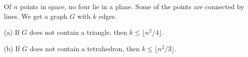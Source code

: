 Of $n$ points in space, no four lie in a plane. Some of the points are connected by lines. We get a graph $G$ with $k$ edges.

(a) If $G$ does not contain a triangle, then $k \leq \lfloor n^2/4 \rfloor$.

(b) If $G$ does not contain a tetrahedron, then $k \leq \lfloor n^2/3 \rfloor$.
